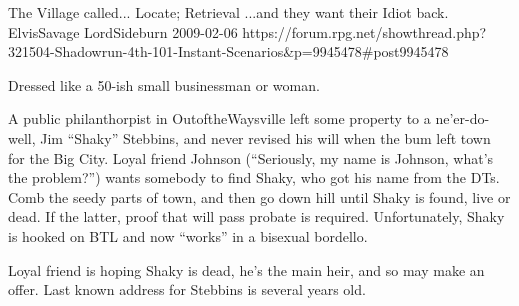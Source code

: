 \begin{scenario}{The Village called...}
	{Locate; Retrieval}
	{...and they want their Idiot back.}
	{ElvisSavage LordSideburn}
	{2009-02-06}
	{https://forum.rpg.net/showthread.php?321504-Shadowrun-4th-101-Instant-Scenarios\&p=9945478\#post9945478}

 Dressed like a 50-ish small businessman or woman.

\synopsis A public philanthorpist in OutoftheWaysville left some property to a ne'er-do-well, Jim ``Shaky'' Stebbins, and never revised his will when the bum left town for the Big City. Loyal friend Johnson (``Seriously, my name is Johnson, what's the problem?'') wants somebody to find Shaky, who got his name from the DTs. Comb the seedy parts of town, and then go down hill until Shaky is found, live or dead. If the latter, proof that will pass probate is required. Unfortunately, Shaky is hooked on BTL and now ``works'' in a bisexual bordello.

\notes Loyal friend is hoping Shaky is dead, he's the main heir, and so may make an offer. Last known address for Stebbins is several years old. 

\end{scenario}